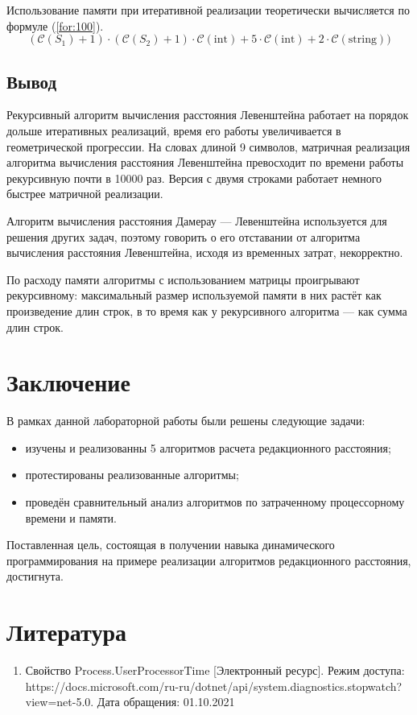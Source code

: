 \documentclass{report}
\begin{document}
Использование памяти при итеративной реализации теоретически вычисляется по формуле (\ref{for:100}).
\begin{equation}
	(\mathcal{C}(S_1) + 1) \cdot (\mathcal{C}(S_2) + 1) \cdot \mathcal{C}\mathrm{(int)} + 5\cdot \mathcal{C}\mathrm{(int)} + 2 \cdot \mathcal{C}\mathrm{(string)})
	\label{for:100}
\end{equation}


\section*{Вывод}

Рекурсивный алгоритм вычисления расстояния Левенштейна работает на порядок дольше итеративных реализаций, время его работы увеличивается в геометрической прогрессии. На словах длиной 9 символов, матричная реализация алгоритма вычисления расстояния Левенштейна превосходит по времени работы рекурсивную почти в 10000 раз. Версия с двумя строками работает немного быстрее матричной реализации. 

Алгоритм вычисления расстояния Дамерау — Левенштейна используется для решения других задач, поэтому говорить о его отставании от алгоритма вычисления расстояния Левенштейна, исходя из временных затрат, некорректно.

По расходу памяти алгоритмы с использованием матрицы проигрывают рекурсивному: максимальный размер используемой памяти в них растёт как произведение длин строк, в то время как у рекурсивного алгоритма — как сумма длин строк.



\chapter*{Заключение}

В рамках данной лабораторной работы были решены следующие задачи:

\begin{itemize}
	\item изучены и реализованны 5 алгоритмов расчета редакционного расстояния;
	\item протестированы реализованные алгоритмы;
	\item проведён сравнительный анализ алгоритмов по затраченному процессорному времени и памяти.
\end{itemize}

Поставленная цель, состоящая в получении навыка динамического программирования на примере реализации алгоритмов редакционного расстояния, достигнута.

\chapter*{Литература}
\begin{enumerate}
	\item Свойство Process.UserProcessorTime [Электронный ресурс]. Режим доступа: https://docs.microsoft.com/ru-ru/dotnet/api/system.diagnostics.stopwatch?view=net-5.0. Дата обращения: 01.10.2021
\end{enumerate}
\end{document}
